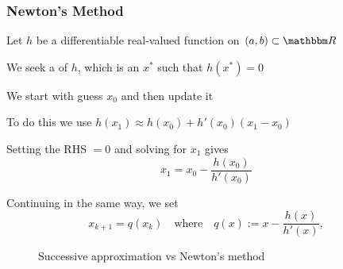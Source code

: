 \begin{frame}
    \frametitle{Newton's Method}

    Let $h$ be a differentiable real-valued function on $(a, b) \subset \RR$

    We seek a  of $h$, which is an $x^*$ such that $h(x^*)=0$

    We start with guess $x_0$  and then update it

    To do this we use $h(x_1) \approx h(x_0) + h'(x_0)(x_1 - x_0)$

    Setting the RHS $=0$ and solving for $x_1$ gives 
    \begin{equation*}
        x_1 = x_0 - \frac{h(x_0)}{h'(x_0)}
    \end{equation*}

    Continuing in the same way, we set
    \begin{equation*}
        x_{k+1} = q(x_k) 
        \quad \text{where} \quad
        q(x) := x - \frac{h(x)}{h'(x)},
    \end{equation*}

\end{frame}


\begin{frame}
    
    \begin{figure}
       \centering
       \caption{\label{f:newton_solow_45} Successive approximation vs Newton's method}
    \end{figure}

\end{frame}

